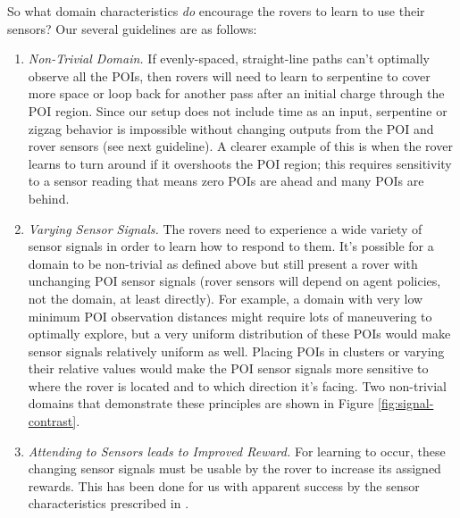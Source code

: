 \documentclass[letterpaper, 10 pt, conference]{ieeeconf}  %
\begin{document}
So what domain characteristics \emph{do} encourage the rovers to learn to use their sensors? Our several guidelines are as follows:

\begin{enumerate}
\item \emph{Non-Trivial Domain.} If evenly-spaced, straight-line paths can't optimally observe all the POIs, then rovers will need to learn to serpentine to cover more space or loop back for another pass after an initial charge through the POI region. Since our setup does not include time as an input, serpentine or zigzag behavior is impossible without changing outputs from the POI and rover sensors (see next guideline). A clearer example of this is when the rover learns to turn around if it overshoots the POI region; this requires sensitivity to a sensor reading that means zero POIs are ahead and many POIs are behind. 

\item \emph{Varying Sensor Signals.} The rovers need to experience a wide variety of sensor signals in order to learn how to respond to them. It's possible for a domain to be non-trivial as defined above but still present a rover with unchanging POI sensor signals (rover sensors will depend on agent policies, not the domain, at least directly). For example, a domain with very low minimum POI observation distances might require lots of maneuvering to optimally explore, but a very uniform distribution of these POIs would make sensor signals relatively uniform as well. Placing POIs in clusters or varying their relative values would make the POI sensor signals more sensitive to where the rover is located and to which direction it's facing. Two non-trivial domains that demonstrate these principles are shown in Figure \ref{fig:signal-contrast}.

\item \emph{Attending to Sensors leads to Improved Reward.} For learning to occur, these changing sensor signals must be usable by the rover to increase its assigned rewards. This has been done for us with apparent success by the sensor characteristics prescribed in \cite{agogino2008analyzing}.


\end{enumerate}
\end{document}
